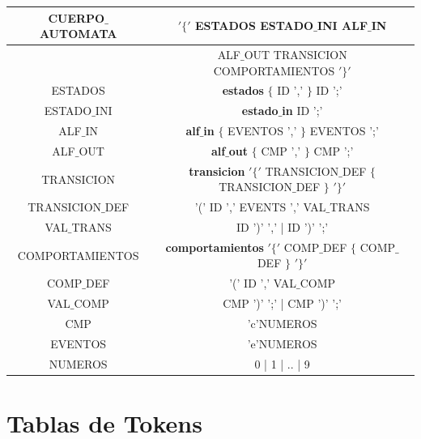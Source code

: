 \documentclass[12pt,a4paper]{article}
\begin{document}
{\begin{center}
\begin{tabular}{|c|c|}
				CUERPO$\_$AUTOMATA	&  $'\{'$ ESTADOS ESTADO$\_$INI ALF$\_$IN  \\ 
				\hline 
					&   ALF$\_$OUT TRANSICION COMPORTAMIENTOS $'\}'$ \\ 
				\hline 
				ESTADOS	&    \textbf{estados} $\{$ ID ',' $\}$ ID ';'\\ 
				\hline 
				 ESTADO$\_$INI & \textbf{estado$\_$in} ID ';'\\ 
				\hline 
				ALF$\_$IN & \textbf{alf$\_$in}  $\{$ EVENTOS ',' $\}$ EVENTOS ';' \\ 
				\hline
				ALF$\_$OUT & \textbf{alf$\_$out}  $\{$ CMP ',' $\}$ CMP ';'  \\ 
				\hline 
				TRANSICION 	 &  \textbf{transicion} $'\{'$ TRANSICION$\_$DEF $\{$ TRANSICION$\_$DEF $\}$ $'\}'$ \\ 
				\hline 
				TRANSICION$\_$DEF &  '(' ID ',' EVENTS ',' VAL$\_$TRANS \\ 
				\hline 
				VAL$\_$TRANS &   ID ')' ',' | ID ')' ';'\\ 
				\hline 
				COMPORTAMIENTOS	 &   \textbf{comportamientos} $'\{'$ COMP$\_$DEF $\{$ COMP$\_$DEF $\}$ $'\}'$\\ 
				\hline 
				COMP$\_$DEF &   '(' ID ',' VAL$\_$COMP \\ 
				\hline 
				VAL$\_$COMP &   CMP ')' ';' | CMP ')' ';' \\ 
				\hline 
				CMP  &  'c'NUMEROS \\ 
				\hline 
				 EVENTOS & 'e'NUMEROS \\ 
				 \hline 
				 NUMEROS & 0 | 1 | .. | 9 \\ 
				 \hline 
				
			\end{tabular} 	
		\end{center}
	
	
	
	

	\newpage
	\section{Tablas de Tokens}
		
}
\end{document}
